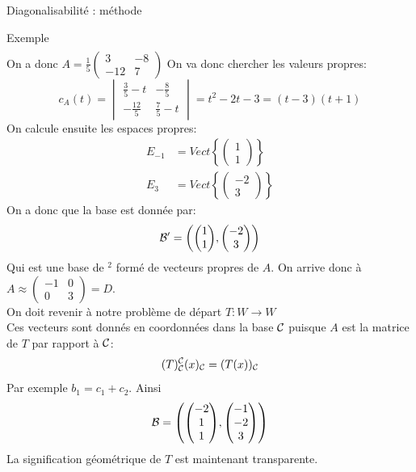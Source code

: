 \begin{parag}{Diagonalisabilité : méthode}
\begin{subparag}{Exemple}
\begin{align*}
        \end{align*}
        On a donc $A = \frac{1}{5}\begin{pmatrix}
            3 & -8 \\ -12 & 7
        \end{pmatrix}$
        On va donc chercher les valeurs propres:
        \[c_A(t) = \begin{vmatrix}
            \frac{3}{5}-t & -\frac{8}{5}\\
            -\frac{12}{5} & \frac{7}{5} - t
        \end{vmatrix} = t^2 -2t -3 = (t-3)(t+1)\]
        On calcule ensuite les espaces propres:
        \begin{align*}
            E_{-1} &= Vect\left\{\begin{pmatrix}
                1 \\ 1
            \end{pmatrix}\right\}\\
            E_3 &= Vect\left\{\begin{pmatrix}
                -2 \\ 3
            \end{pmatrix}\right\}
        \end{align*}
        On a donc que la base est donnée par:
        \[\bmath' = \left(\begin{pmatrix}
            1 \\ 1
        \end{pmatrix}, \begin{pmatrix}
            -2 \\ 3
        \end{pmatrix}\right)\]
        Qui est une base de \R$^2$ formé de vecteurs propres de $A$.
        On arrive donc à $A \approx \begin{pmatrix}
            -1 & 0 \\ 0 & 3
        \end{pmatrix} = D$.\\
        On doit revenir à notre problème de départ $T : W \to W$
        \\
        Ces vecteurs sont donnés en coordonnées dans la base $\mathcal{C}$ puisque $A$ est la matrice de $T$ par rapport à $\mathcal{C}$:
        \[(T)_{\mathcal{C}}^{\mathcal{C}} (x)_{\mathcal{C}} = (T(x))_{\mathcal{C}}\]
        Par exemple $b_1 = c_1 + c_2$. Ainsi
        \[\bmath = \left(\begin{pmatrix}
            -2 \\ 1 \\ 1
        \end{pmatrix}, \begin{pmatrix}
            -1 \\-2 \\ 3
        \end{pmatrix}\right)\]
        La signification géométrique de $T$ est maintenant transparente.
    \end{subparag}
\end{parag}

